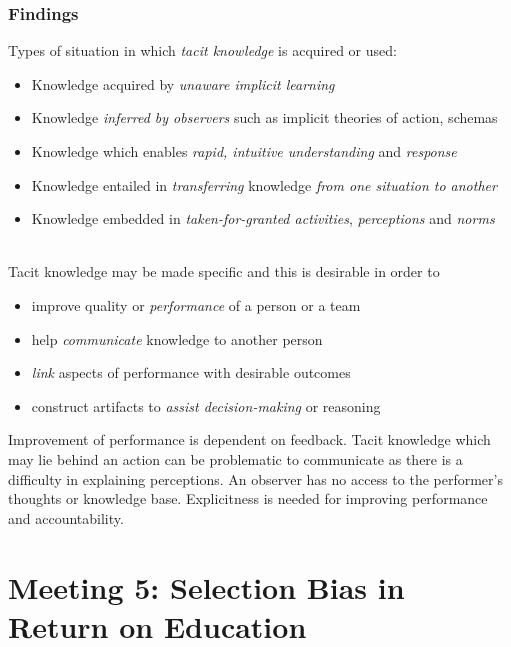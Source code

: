\documentclass[12pt,a4paper]{article}
\begin{document}
    \subsubsection{Findings}
      Types of situation in which \emph{tacit knowledge} is acquired or used:
      \begin{itemize}
        \item Knowledge acquired by \emph{unaware implicit learning}
        \item Knowledge \emph{inferred by observers} such as implicit theories of action, schemas
        \item Knowledge which enables \emph{rapid, intuitive understanding} and \emph{response}
        \item Knowledge entailed in \emph{transferring} knowledge \emph{from one situation to another}
        \item Knowledge embedded in \emph{taken-for-granted activities}, \emph{perceptions} and \emph{norms}
      \end{itemize}
      \\
      Tacit knowledge may be made specific and this is desirable in order to
      \begin{itemize}
        \item improve quality or \emph{performance} of a person or a team
        \item help \emph{communicate} knowledge to another person
        \item \emph{link} aspects of performance with desirable outcomes
        \item construct artifacts to \emph{assist decision-making} or reasoning
      \end{itemize}
      Improvement of performance is dependent on feedback. Tacit knowledge which may lie behind an action can be problematic to communicate as there is a difficulty in explaining perceptions. An observer has no access to the performer's thoughts or knowledge base. Explicitness is needed for improving performance and accountability.



\section{Meeting 5: Selection Bias in Return on Education} %
\label{sec:Meeting 5}
\end{document}
